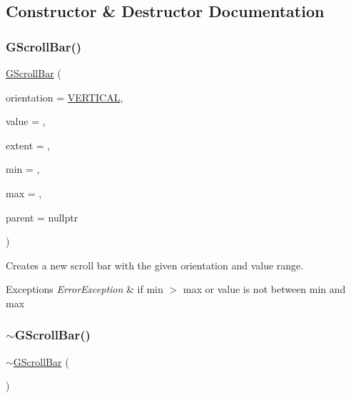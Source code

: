 \subsection{Constructor \& Destructor Documentation}
\mbox{\label{classGScrollBar_aed316f3139eb0a6e80da4d1dcf171a43}} 
\subsubsection{\texorpdfstring{G\+Scroll\+Bar()}{GScrollBar()}}
{\footnotesize\ttfamily \mbox{\hyperlink{classGScrollBar}{G\+Scroll\+Bar}} (\begin{DoxyParamCaption}\item[{\mbox{\hyperlink{classGScrollBar_a871118a09520247c78a71ecd7b0abd58}{G\+Scroll\+Bar\+::\+Orientation}}}]{orientation = {\ttfamily \mbox{\hyperlink{classGScrollBar_a871118a09520247c78a71ecd7b0abd58a1a88641fcd39f2ed3e58a18526e97138}{V\+E\+R\+T\+I\+C\+AL}}},  }\item[{int}]{value = {},  }\item[{int}]{extent = {},  }\item[{int}]{min = {},  }\item[{int}]{max = {},  }\item[{Q\+Widget $\ast$}]{parent = {\ttfamily nullptr} }\end{DoxyParamCaption})}



Creates a new scroll bar with the given orientation and value range. 


\begin{DoxyExceptions}{Exceptions}
{\em Error\+Exception} & if min $>$ max or value is not between min and max \\
\hline
\end{DoxyExceptions}
\mbox{\label{classGScrollBar_a0b1ea2ea7b58f299e20c6d75249f1a2e}} 
\subsubsection{\texorpdfstring{$\sim$\+G\+Scroll\+Bar()}{~GScrollBar()}}
{\footnotesize\ttfamily $\sim$\mbox{\hyperlink{classGScrollBar}{G\+Scroll\+Bar}} (\begin{DoxyParamCaption}{ }\end{DoxyParamCaption})\hspace{0.3cm}{\ttfamily [override]}}




